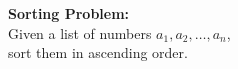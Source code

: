 \documentclass[preview]{standalone}
\begin{document}
\begin{center}
\textbf{Sorting Problem:} \\
        Given a list of numbers $a_1, a_2, \dots, a_n$, \\
        sort them in ascending order.
\end{center}
\end{document}
